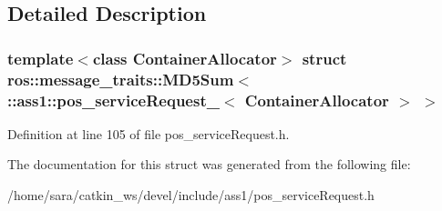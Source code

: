 \subsection{Detailed Description}
\subsubsection*{template$<$class Container\+Allocator$>$\newline
struct ros\+::message\+\_\+traits\+::\+M\+D5\+Sum$<$ \+::ass1\+::pos\+\_\+service\+Request\+\_\+$<$ Container\+Allocator $>$ $>$}



Definition at line 105 of file pos\+\_\+service\+Request.\+h.



The documentation for this struct was generated from the following file\+:\begin{DoxyCompactItemize}
\item 
/home/sara/catkin\+\_\+ws/devel/include/ass1/pos\+\_\+service\+Request.\+h\end{DoxyCompactItemize}
